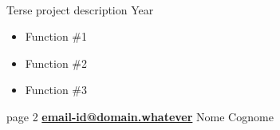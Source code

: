 \documentclass[letterpaper,10pt]{article}
\begin{document}
\vspace{-0.45cm}\hspace{0cm}\\
Terse project description \hfill Year \vspace{-0.2cm}
\begin{itemize} \itemsep -4pt
\item Function \#1
\item Function \#2
\item Function \#3
\end{itemize}




\newpage
\hspace{-0.5cm}page 2 \hfill {\bf \href{mailto:email-id@domain.whatever}{email-id@domain.whatever}} \hfill Nome Cognome

\vspace{-0.6cm}\hspace{0cm}\\
\end{document}
